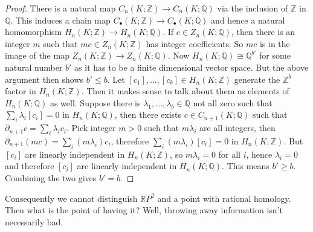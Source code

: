 \begin{proof}
    There is a natural map $C_n(K;\mathbb Z)\to C_n(K;\mathbb Q)$ via the inclusion of $\mathbb Z$ in $\mathbb Q$.
    This induces a chain map $C_\bullet(K;\mathbb Z)\to C_\bullet(K;\mathbb Q)$ and hence a natural homomorphism $H_n(K;\mathbb Z)\to H_n(K;\mathbb Q)$.
    If $c\in Z_n(K;\mathbb Q)$, then there is an integer $m$ such that $mc\in Z_n(K;\mathbb Z)$ has integer coefficients.
    So $mc$ is in the image of the map $Z_n(K;\mathbb Z)\to Z_n(K;\mathbb Q)$.
    Now $H_n(K;\mathbb Q)\cong\mathbb Q^{b'}$ for some natural number $b'$ as it has to be a finite dimensional vector space.
    But the above argument then shows $b'\le b$.
    Let $[c_1],\ldots,[c_b]\in H_n(K;\mathbb Z)$ generate the $\mathbb Z^b$ factor in $H_n(K;\mathbb Z)$.
    Then it makes sense to talk about them as elements of $H_n(K;\mathbb Q)$ as well.
    Suppose there is $\lambda_1,\ldots,\lambda_b\in\mathbb Q$ not all zero such that $\sum_i\lambda_i[c_i]=0$ in $H_n(K;\mathbb Q)$, then there exists $c\in C_{n+1}(K;\mathbb Q)$ such that $\partial_{n+1}c=\sum_i\lambda_ic_i$.
    Pick integer $m>0$ such that $m\lambda_i$ are all integers, then $\partial_{n+1}(mc)=\sum_i(m\lambda_i)c_i$, therefore $\sum_i(m\lambda_i)[c_i]=0$ in $H_n(K;\mathbb Z)$.
    But $[c_i]$ are linearly independent in $H_n(K;\mathbb Z)$, so $m\lambda_i=0$ for all $i$, hence $\lambda_i=0$ and therefore $[c_i]$ are linearly independent in $H_n(K;\mathbb Q)$.
    This means $b'\ge b$.
    Combining the two gives $b'=b$.
\end{proof}
Consequently we cannot distinguish $\mathbb RP^2$ and a point with rational homology.
Then what is the point of having it?
Well, throwing away information isn't necessarily bad.
